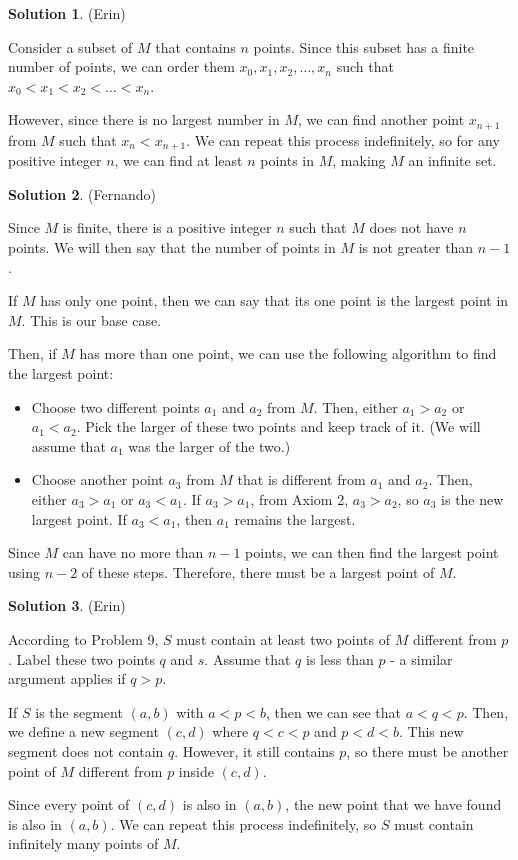\documentclass{article}
\theoremstyle{definition}
\newtheorem{solution}{Solution}
\begin{document}
\begin{solution} %
(Erin)

Consider a subset of $M$ that contains $n$ points.
Since this subset has a finite number of points, we can order them $x_0, x_1, x_2, \dots, x_n$ such that $x_0 < x_1 < x_2 < \dots < x_n$.

However, since there is no largest number in $M$, we can find another point $x_{n+1}$ from $M$ such that $x_n < x_{n+1}$.
We can repeat this process indefinitely, so for any positive integer $n$, we can find at least $n$ points in $M$, making $M$ an infinite set.  
\end{solution}

\begin{solution} %
(Fernando)

Since $M$ is finite, there is a positive integer $n$ such that $M$ does not have $n$ points.
We will then say that the number of points in $M$ is not greater than $n-1$.

If $M$ has only one point, then we can say that its one point is the largest point in $M$.
This is our base case.

Then, if $M$ has more than one point, we can use the following algorithm to find the largest point:

\begin{itemize}
\item
Choose two different points $a_1$ and $a_2$ from $M$.
Then, either $a_1 > a_2$ or $a_1 < a_2$.
Pick the larger of these two points and keep track of it.
(We will assume that $a_1$ was the larger of the two.)

\item
Choose another point $a_3$ from $M$ that is different from $a_1$ and $a_2$.
Then, either $a_3 > a_1$ or $a_3 < a_1$.
If $a_3 > a_1$, from Axiom 2, $a_3 > a_2$, so $a_3$ is the new largest point.
If $a_3 < a_1$, then $a_1$ remains the largest.
\end{itemize}

Since $M$ can have no more than $n-1$ points, we can then find the largest point using $n-2$ of these steps.
Therefore, there must be a largest point of $M$. 
\end{solution}

\begin{solution} %
(Erin)

According to Problem 9, $S$ must contain at least two points of $M$ different from $p$.
Label these two points $q$ and $s$.
Assume that $q$ is less than $p$ - a similar argument applies if $q > p$.

If $S$ is the segment $(a, b)$ with $a < p < b$, then we can see that $a < q < p$.
Then, we define a new segment $(c, d)$ where $q < c < p$ and $p < d < b$.
This new segment does not contain $q$.
However, it still contains $p$, so there must be another point of $M$ different from $p$ inside $(c, d)$.

Since every point of $(c, d)$ is also in $(a, b)$, the new point that we have found is also in $(a, b)$.
We can repeat this process indefinitely, so $S$ must contain infinitely many points of $M$.
\end{solution}
\end{document}
